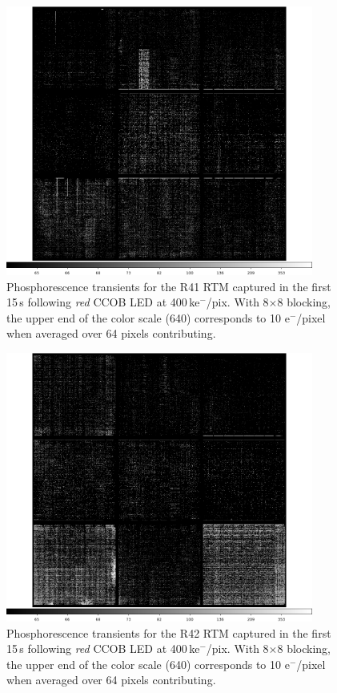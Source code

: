 \begin{figure}[!htbp]
\centering
\includegraphics[width=0.9\textwidth]{figures/phosphorescence-survey/itl_fluor_R41_0-19_rb1_log.png}
\caption{Phosphorescence transients for the R41 RTM captured in the first 15\,s following {\it red} CCOB LED at 400\,ke$^-$/pix. With 8$\times$8 blocking, the upper end of the color scale (640) corresponds to 10 e$^-$/pixel when averaged over 64 pixels contributing.}
\label{fig:phos:R41}
\end{figure}

\begin{figure}[!htbp]
\centering
\includegraphics[width=0.9\textwidth]{figures/phosphorescence-survey/itl_fluor_R42_0-19_rb1_log.png}
\caption{Phosphorescence transients for the R42 RTM captured in the first 15\,s following {\it red} CCOB LED at 400\,ke$^-$/pix. With 8$\times$8 blocking, the upper end of the color scale (640) corresponds to 10 e$^-$/pixel when averaged over 64 pixels contributing.}
\label{fig:phos:R42}
\end{figure}

